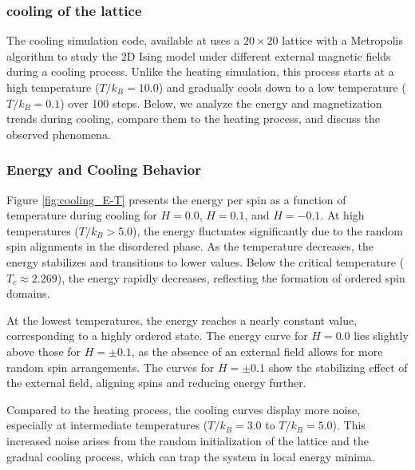 \documentclass[11pt]{article}
\begin{document}
\subsubsection{cooling of the lattice}

\noindent The cooling simulation code, available at uses a \(20 \times 20\) lattice with a Metropolis algorithm to study the 2D Ising model under different external magnetic fields during a cooling process. Unlike the heating simulation, this process starts at a high temperature (\(T / k_B = 10.0\)) and gradually cools down to a low temperature (\(T / k_B = 0.1\)) over 100 steps. Below, we analyze the energy and magnetization trends during cooling, compare them to the heating process, and discuss the observed phenomena.

\subsubsection*{Energy and Cooling Behavior}
Figure \ref{fig:cooling_E-T} presents the energy per spin as a function of temperature during cooling for \(H = 0.0\), \(H = 0.1\), and \(H = -0.1\). At high temperatures (\(T / k_B > 5.0\)), the energy fluctuates significantly due to the random spin alignments in the disordered phase. As the temperature decreases, the energy stabilizes and transitions to lower values. Below the critical temperature (\(T_c \approx 2.269\)), the energy rapidly decreases, reflecting the formation of ordered spin domains.

At the lowest temperatures, the energy reaches a nearly constant value, corresponding to a highly ordered state. The energy curve for \(H = 0.0\) lies slightly above those for \(H = \pm 0.1\), as the absence of an external field allows for more random spin arrangements. The curves for \(H = \pm 0.1\) show the stabilizing effect of the external field, aligning spins and reducing energy further.

Compared to the heating process, the cooling curves display more noise, especially at intermediate temperatures (\(T / k_B = 3.0\) to \(T / k_B = 5.0\)). This increased noise arises from the random initialization of the lattice and the gradual cooling process, which can trap the system in local energy minima.
\end{document}
